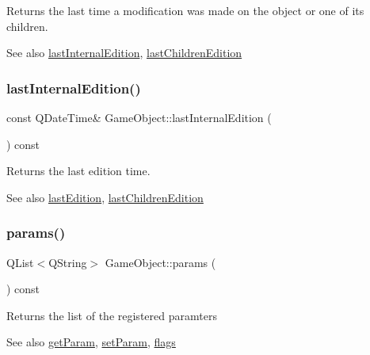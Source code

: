 Returns the last time a modification was made on the object or one of its children.

\begin{DoxySeeAlso}{See also}
\hyperlink{class_game_object_a76035507be4203cc72186f210a9c4fee}{last\+Internal\+Edition}, \hyperlink{class_game_object_a83b0ea6d2c30edf0b70d3a9e2e80563b}{last\+Children\+Edition} 
\end{DoxySeeAlso}
\hypertarget{class_game_object_a76035507be4203cc72186f210a9c4fee}{}\label{class_game_object_a76035507be4203cc72186f210a9c4fee} 
\subsubsection{\texorpdfstring{last\+Internal\+Edition()}{lastInternalEdition()}}
{\footnotesize\ttfamily const Q\+Date\+Time\& Game\+Object\+::last\+Internal\+Edition (\begin{DoxyParamCaption}{ }\end{DoxyParamCaption}) const\hspace{0.3cm}{\ttfamily [inline]}}

Returns the last edition time.

\begin{DoxySeeAlso}{See also}
\hyperlink{class_game_object_a060fb833acf28832fa85a7927227bdde}{last\+Edition}, \hyperlink{class_game_object_a83b0ea6d2c30edf0b70d3a9e2e80563b}{last\+Children\+Edition} 
\end{DoxySeeAlso}
\hypertarget{class_game_object_a5d42c482092a7dde84261ac466e815c8}{}\label{class_game_object_a5d42c482092a7dde84261ac466e815c8} 
\subsubsection{\texorpdfstring{params()}{params()}}
{\footnotesize\ttfamily Q\+List$<$Q\+String$>$ Game\+Object\+::params (\begin{DoxyParamCaption}{ }\end{DoxyParamCaption}) const\hspace{0.3cm}{\ttfamily [inline]}}

Returns the list of the registered paramters

\begin{DoxySeeAlso}{See also}
\hyperlink{class_game_object_a328ee07594f27b294fcac02099be393b}{get\+Param}, \hyperlink{class_game_object_a28b8af7f399f1348a4f3130dd21173a1}{set\+Param}, \hyperlink{class_game_object_ad6f21f7458be4192a920013dbb3e590e}{flags} 
\end{DoxySeeAlso}
\hypertarget{class_game_object_ae7984096fc518b15c0b080c543e4c42f}{}\label{class_game_object_ae7984096fc518b15c0b080c543e4c42f} 

